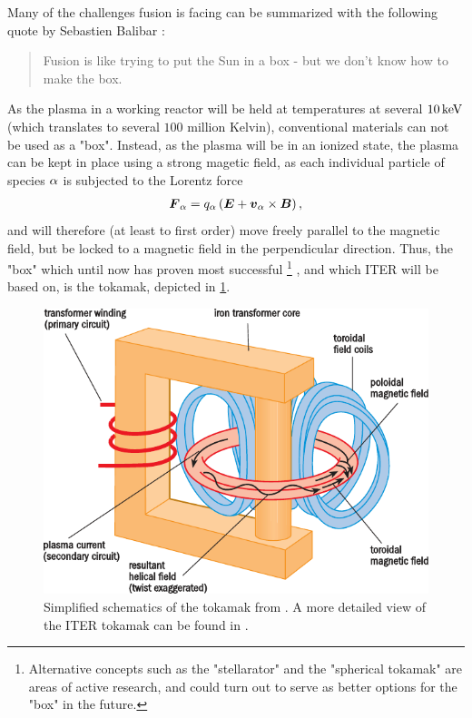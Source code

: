 Many of the challenges fusion is facing can be summarized with the following quote by Sebastien Balibar \cite{Balibar2009Web}:
%
\begin{quote}
    Fusion is like trying to put the Sun in a box - but we don't know how to make the box.
\end{quote}
%
As the plasma in a working reactor will be held at temperatures at several $10 \, \text{keV}$ (which translates to several $100$ million Kelvin), conventional materials can not be used as a "box".
Instead, as the plasma will be in an ionized state, the plasma can be kept in place using a strong magetic field, as each individual particle of species $\alpha$ is subjected to the Lorentz force
%
\begin{align*}
    \boldsymbol{F}_\alpha = q_\alpha \left(\boldsymbol{E} + \boldsymbol{v}_\alpha\times\boldsymbol{B}\right),
\end{align*}
%
and will therefore (at least to first order) move freely parallel to the magnetic field, but be locked to a magnetic field in the perpendicular direction.
Thus, the "box" which until now has proven most successful%
\footnote{Alternative concepts such as the "stellarator" and the "spherical tokamak" are areas of active research, and could turn out to serve as better options for the "box" in the future.}
%
, and which ITER will be based on, is the tokamak, depicted in \cref{fig:tokamak}.
%
\begin{figure}[htb]
    \begin{center}
        \includegraphics{fig/intro/tokamak}
    \end{center}
    \caption{Simplified schematics of the tokamak from \cite{nuttall2008}.
        A more detailed view of the ITER tokamak can be found in \cite{ITERWeb}.}
    \label{fig:tokamak}
\end{figure}

